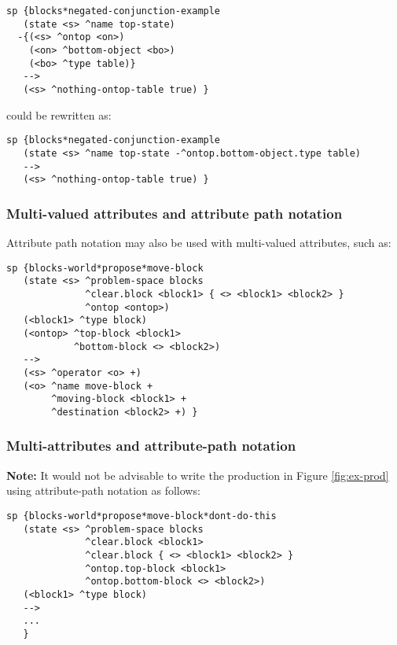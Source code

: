 \begin{verbatim}
sp {blocks*negated-conjunction-example
   (state <s> ^name top-state)
  -{(<s> ^ontop <on>)
    (<on> ^bottom-object <bo>)
    (<bo> ^type table)}
   -->
   (<s> ^nothing-ontop-table true) } 
\end{verbatim}

could be rewritten as:

\begin{verbatim}
sp {blocks*negated-conjunction-example
   (state <s> ^name top-state -^ontop.bottom-object.type table)
   -->
   (<s> ^nothing-ontop-table true) }
\end{verbatim}


\subsubsection*{Multi-valued attributes and attribute path notation}


Attribute path notation may also be used with multi-valued attributes, such as:

\begin{verbatim}
sp {blocks-world*propose*move-block
   (state <s> ^problem-space blocks
              ^clear.block <block1> { <> <block1> <block2> }
              ^ontop <ontop>)
   (<block1> ^type block)
   (<ontop> ^top-block <block1>
            ^bottom-block <> <block2>)
   -->
   (<s> ^operator <o> +)
   (<o> ^name move-block +
        ^moving-block <block1> +
        ^destination <block2> +) }
\end{verbatim}


\subsubsection*{Multi-attributes and attribute-path notation}
\label{SYNTAX-pm-lhs-caveat}

\textbf{Note:} It would not be advisable to write the production in Figure \ref{fig:ex-prod} using attribute-path notation as follows:

\begin{verbatim}
sp {blocks-world*propose*move-block*dont-do-this
   (state <s> ^problem-space blocks
              ^clear.block <block1>
              ^clear.block { <> <block1> <block2> }
              ^ontop.top-block <block1>
              ^ontop.bottom-block <> <block2>)
   (<block1> ^type block)
   -->
   ...
   }
\end{verbatim}


